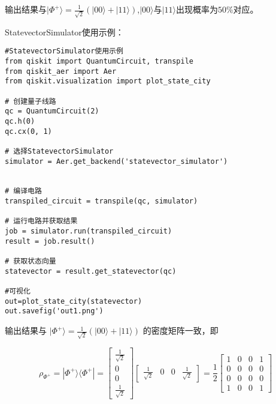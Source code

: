 输出结果与\( |\Phi^{+}\rangle = \frac{1}{\sqrt{2}} (|00\rangle + |11\rangle) \),$|00\rangle$与$|11\rangle$出现概率为$50\%$对应。

StatevectorSimulator使用示例：

\begin{py}
\begin{lstlisting}
#StatevectorSimulator使用示例
from qiskit import QuantumCircuit, transpile
from qiskit_aer import Aer
from qiskit.visualization import plot_state_city

# 创建量子线路
qc = QuantumCircuit(2)
qc.h(0)
qc.cx(0, 1)

# 选择StatevectorSimulator
simulator = Aer.get_backend('statevector_simulator') 


# 编译电路
transpiled_circuit = transpile(qc, simulator)

# 运行电路并获取结果
job = simulator.run(transpiled_circuit)
result = job.result()

# 获取状态向量
statevector = result.get_statevector(qc)

#可视化
out=plot_state_city(statevector)
out.savefig('out1.png')
\end{lstlisting}
\end{py}
输出结果与 \( |\Phi^{+}\rangle = \frac{1}{\sqrt{2}} (|00\rangle + |11\rangle) \) 的密度矩阵一致，即

\[
\rho_{\Phi^{+}} = |\Phi^{+}\rangle \langle \Phi^{+}|
= \begin{bmatrix} \frac{1}{\sqrt{2}} \\ 0 \\ 0 \\ \frac{1}{\sqrt{2}} \end{bmatrix} \begin{bmatrix} \frac{1}{\sqrt{2}} & 0 & 0 & \frac{1}{\sqrt{2}} \end{bmatrix}
= \frac{1}{2} \begin{bmatrix} 1 & 0 & 0 & 1 \\ 0 & 0 & 0 & 0 \\ 0 & 0 & 0 & 0 \\ 1 & 0 & 0 & 1 \end{bmatrix}
\]


